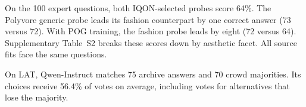 \showExternal

On the 100 expert questions, both IQON-selected probes score 64\%. The Polyvore generic probe leads its fashion counterpart by one correct answer (73 versus 72). With POG training, the fashion probe leads by eight (72 versus 64). Supplementary Table~S2 breaks these scores down by aesthetic facet. All source fits face the same questions.

On LAT, Qwen-Instruct matches 75 archive answers and 70 crowd majorities. Its choices receive 56.4\% of votes on average, including votes for alternatives that lose the majority.
